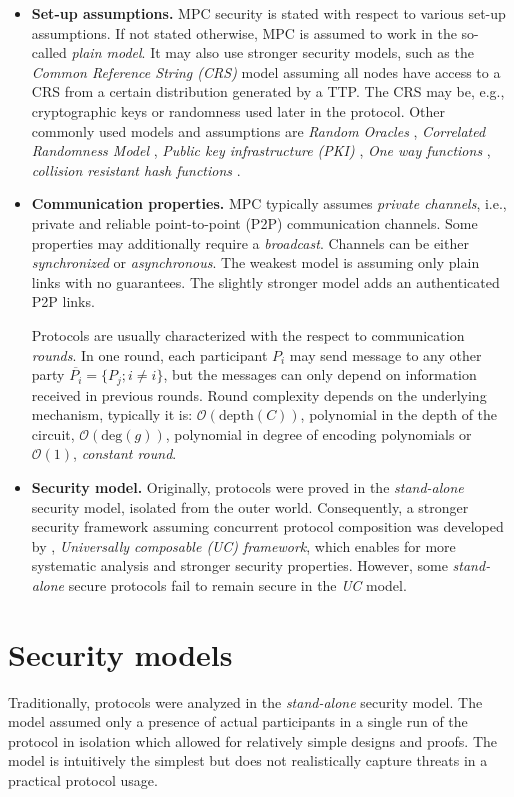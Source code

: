 \documentclass[
  digital, %
  twoside, %
  table,   %
  lof,     %
  lot,     %
]{fithesis3}
\newcommand{\itembf}[1]{\item {\bf{#1}}}
\newcommand{\bigO}[0]{\mathcal{O}}
\theoremstyle{definition}
\theoremstyle{remark}
\begin{document}
\begin{itemize}
    \itembf{Set-up assumptions.} MPC security is stated with respect to various set-up assumptions. If not stated otherwise, MPC is assumed to work in the so-called \emph{plain model}. It may also use stronger security models, such as the \emph{Common Reference String (CRS)} model \cite{CF01,DN02} assuming all nodes have access to a CRS from a certain distribution generated by a TTP. The CRS may be, e.g., cryptographic keys or randomness used later in the protocol. Other commonly used models and assumptions are \emph{Random Oracles} \cite{HM04}, \emph{Correlated Randomness Model} \cite{FGMR02, FWW04, IKMOP13}, \emph{Public key infrastructure (PKI)} \cite{BCNP04}, \emph{One way functions} \cite{IL89, KL07}, \emph{collision resistant hash functions} \cite{KL07, GMS08}.
    
    \itembf{Communication properties.} MPC typically assumes \emph{private channels}, i.e., private and reliable point-to-point (P2P) communication channels. Some properties may additionally require a \emph{broadcast}. Channels can be either \emph{synchronized} or \emph{asynchronous}. The weakest model is assuming only plain links with no guarantees. The slightly stronger model adds an authenticated P2P links.
    
    Protocols are usually characterized with the respect to communication \emph{rounds}. In one round, each participant $P_i$ may send message to any other party $\overline{P_i} = \{P_j; i \neq i\}$, but the messages can only depend on information received in previous rounds. Round complexity depends on the underlying mechanism, typically it is: $\bigO(\text{depth}(C))$, polynomial in the depth of the circuit, $\bigO(\text{deg}(g))$, polynomial in degree of encoding polynomials or $\bigO(1)$, \emph{constant round}.
    
    \itembf{Security model.} Originally, protocols were proved in the \emph{stand-alone} security model, isolated from the outer world. Consequently, a stronger security framework assuming concurrent protocol composition was developed by \cite{Can01}, \emph{Universally composable (UC) framework}, which enables for more systematic analysis and stronger security properties. However, some \emph{stand-alone} secure protocols fail to remain secure in the \emph{UC} model.
    
\end{itemize}

\section{Security models}\label{sec:uc}%
Traditionally, protocols were analyzed in the \emph{stand-alone} security model. The model assumed only a presence of actual participants in a single run of the protocol in isolation which allowed for relatively simple designs and proofs. The model is intuitively the simplest but does not realistically capture threats in a practical protocol usage. 
\end{document}
